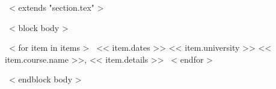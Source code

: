 ~< extends "section.tex" >~

~< block body >~
\begin{entrylistThree}
~< for item in items >~
\entryThree
{<< item.dates >>}
{<< item.university >>}
{<< item.course.name >>, << item.details >>}
~< endfor >~
\end{entrylistThree}
~< endblock body >~
